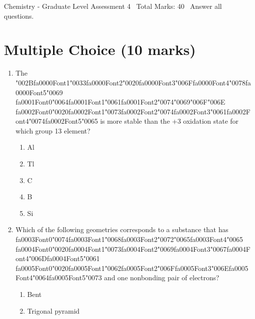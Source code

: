 \documentclass[12pt]{article}
\begin{document}
\begin{center}
Chemistry - Graduate Level Assessment 4 \
Total Marks: 40 \
Answer all questions.
\end{center}

\section*{Multiple Choice (10 marks)}
\begin{enumerate}[label=\arabic*.]
\item The {\char"002B}{\csname fa0000Font1\endcsname\char"0033}{\csname fa0000Font2\endcsname\char"0020}{\csname fa0000Font3\endcsname\char"006F}{\csname fa0000Font4\endcsname\char"0078}{\csname fa0000Font5\endcsname\char"0069} {\csname fa0001Font0\endcsname\char"0064}{\csname fa0001Font1\endcsname\char"0061}{\csname fa0001Font2\endcsname\char"0074}{\char"0069}{\char"006F}{\char"006E} {\csname fa0002Font0\endcsname\char"0020}{\csname fa0002Font1\endcsname\char"0073}{\csname fa0002Font2\endcsname\char"0074}{\csname fa0002Font3\endcsname\char"0061}{\csname fa0002Font4\endcsname\char"0074}{\csname fa0002Font5\endcsname\char"0065} is more stable than the +3 oxidation state for which group 13
element?
\begin{enumerate}[label=(\alph*)]
    \item Al
    \item Tl
    \item C
    \item B
    \item Si
\end{enumerate}
\item Which of the following geometries corresponds to a substance that has {\csname fa0003Font0\endcsname\char"0074}{\csname fa0003Font1\endcsname\char"0068}{\csname fa0003Font2\endcsname\char"0072}{\char"0065}{\csname fa0003Font4\endcsname\char"0065} {\csname fa0004Font0\endcsname\char"0020}{\csname fa0004Font1\endcsname\char"0073}{\csname fa0004Font2\endcsname\char"0069}{\csname fa0004Font3\endcsname\char"0067}{\csname fa0004Font4\endcsname\char"006D}{\csname fa0004Font5\endcsname\char"0061} {\csname fa0005Font0\endcsname\char"0020}{\csname fa0005Font1\endcsname\char"0062}{\csname fa0005Font2\endcsname\char"006F}{\csname fa0005Font3\endcsname\char"006E}{\csname fa0005Font4\endcsname\char"0064}{\csname fa0005Font5\endcsname\char"0073} and
one nonbonding pair of electrons?
\begin{enumerate}[label=(\alph*)]
    \item Bent
    \item Trigonal pyramid

\end{enumerate}
\end{enumerate}
\end{document}
